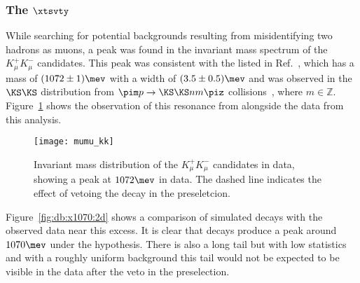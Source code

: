 \subsubsection[The \xtsvty]{The $\boldsymbol{\xtsvty}$}
\label{sec:x1070}

While searching for potential backgrounds resulting from misidentifying two hadrons as muons, a
peak was found in the invariant mass spectrum of the $K_\mu^+K_\mu^-$ candidates.
This peak was consistent with the \xtsvty listed in Ref.~\cite{PDG2014}, which has a mass of
$(1072\pm1)\mev$ with a width of $(3.5\pm0.5)\mev$ and was observed in the $\KS\KS$ distribution
from $\pim p \to \KS \KS n m\piz$ collisions~\cite{x1070vlad}, where $m\in\mathbb{Z}$.
Figure~\ref{fig:x1070} shows the observation of this resonance from  alongside
the data from this analysis.

\begin{figure}
  \begin{center}
    \texttt{[image: mumu\_kk]}
    \caption[Invariant mass of the \mumu distribution under the \kk mass hypotheses]
    {
      Invariant mass distribution of the $K_\mu^+K_\mu^-$ candidates in data, showing a peak at
      \approx$1072\mev$ in data.
      The dashed line indicates the effect of vetoing the decay
      \decay{\KS}{\pip\pim} in the preseletcion.
    }
    \label{fig:x1070}
  \end{center}
\end{figure}

Figure~\ref{fig:db:x1070:2d} shows a comparison of simulated \decay{\KS}{\pipi} decays with the
observed data near this excess.
It is clear that \decay{\KS}{\pipi} decays produce a peak around $1070\mev$ under the \kk
hypothesis.
There is also a long tail but with low statistics and with a roughly uniform
background this tail would not be expected to be visible in the data after the \KS veto in the
preselection.

